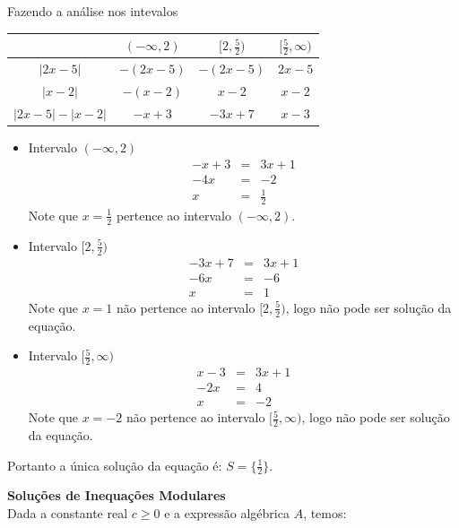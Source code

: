 \begin{exe}
Fazendo a análise nos intevalos \\
\begin{table}[h!]
    \centering
    \begin{tabular}{c|c|c|c}
         & $(-\infty,2)$ & $[2, \frac{5}{2})$ & $[\frac{5}{2}, \infty)$  \\
         \hline
       $|2x-5|$  & $-(2x-5)$ & $-(2x-5)$ & $2x-5$ \\
       \hline
        $|x-2|$  & $-(x-2)$ & $x-2$ & $x-2$ \\
        \hline
         $|2x-5|-|x-2|$  & $-x+3$ & $-3x+7$ & $x-3$ \\
    \end{tabular}
    \label{tab:my_label}
\end{table}
\begin{itemize}
    \item[1] Intervalo $(-\infty, 2)$
    \begin{eqnarray*}
    -x+3 &=& 3x+1 \\
    -4x &=& -2 \\
    x &=& \frac{1}{2}
    \end{eqnarray*}
    Note que $x= \frac{1}{2} $ pertence ao intervalo $(-\infty,2)$.
    \item[2.] Intervalo $[2, \frac{5}{2})$
    \begin{eqnarray*}
    -3x+7 &=& 3x+1 \\
    -6x &=& -6 \\
    x &=& 1
    \end{eqnarray*}
    Note que $x= 1 $ não pertence ao intervalo $[2,\frac{5}{2})$, logo não pode ser solução da equação.

    \item[3.] Intervalo $[\frac{5}{2}, \infty)$
    \begin{eqnarray*}
    x-3 &=& 3x+1 \\
    -2x &=& 4 \\
    x &=& -2
    \end{eqnarray*}
    Note que $x= -2 $ não pertence ao intervalo $[\frac{5}{2}, \infty)$, logo não pode ser solução da equação.

\end{itemize}
Portanto a única solução da equação é: $S=\{\frac{1}{2}\}$.

\color{black}
\end{exe}

\textbf{Soluções de Inequações Modulares} \\
Dada a constante real $c \geq 0$ e a expressão algébrica $A$, temos:

